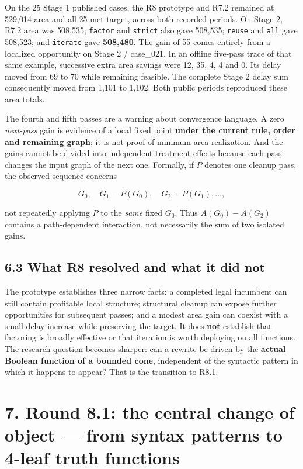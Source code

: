 On the 25 Stage 1 published cases, the R8 prototype and R7.2 remained at 529,014 area and all 25 met target, across both recorded periods. On Stage 2, R7.2 area was 508,535; \texttt{factor} and \texttt{strict} also gave 508,535; \texttt{reuse} and \texttt{all} gave 508,523; and \texttt{iterate} gave \textbf{508,480}. The gain of 55 comes entirely from a localized opportunity on Stage 2 / case\_021. In an offline five-pass trace of that same example, successive extra area savings were 12, 35, 4, 4 and 0. Its delay moved from 69 to 70 while remaining feasible. The complete Stage 2 delay sum consequently moved from 1,101 to 1,102. Both public periods reproduced these area totals.

The fourth and fifth passes are a warning about convergence language. A zero \emph{next-pass} gain is evidence of a local fixed point \textbf{under the current rule, order and remaining graph}; it is not proof of minimum-area realization. And the gains cannot be divided into independent treatment effects because each pass changes the input graph of the next one. Formally, if \(P\) denotes one cleanup pass, the observed sequence concerns

\[
G_0,\quad G_1=P(G_0),\quad G_2=P(G_1),\ldots,
\]

not repeatedly applying \(P\) to the \emph{same} fixed \(G_0\). Thus \(A(G_0)-A(G_2)\) contains a path-dependent interaction, not necessarily the sum of two isolated gains.

\subsection{6.3 What R8 resolved and what it did not}\label{what-r8-resolved-and-what-it-did-not}

The prototype establishes three narrow facts: a completed legal incumbent can still contain profitable local structure; structural cleanup can expose further opportunities for subsequent passes; and a modest area gain can coexist with a small delay increase while preserving the target. It does \textbf{not} establish that factoring is broadly effective or that iteration is worth deploying on all functions. The research question becomes sharper: can a rewrite be driven by the \textbf{actual Boolean function of a bounded cone}, independent of the syntactic pattern in which it happens to appear? That is the transition to R8.1.

\section{7. Round 8.1: the central change of object --- from syntax patterns to 4-leaf truth functions}\label{round-8.1-the-central-change-of-object-from-syntax-patterns-to-4-leaf-truth-functions}

